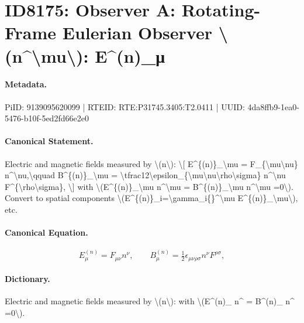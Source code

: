 \section*{ID8175: Observer A: Rotating-Frame Eulerian Observer \textbackslash{}(n\textasciicircum{}\textbackslash{}mu\textbackslash{}): E\textasciicircum{}(n)\_μ}
\paragraph{Metadata.}
PiID: 9139095620099 | RTEID: RTE:P31745.3405:T2.0411 | UUID: 4da8ffb9-1ea0-5476-b10f-5ed2fd66e2e0

\paragraph{Canonical Statement.}
Electric and magnetic fields measured by \textbackslash{}(n\textbackslash{}): \textbackslash{}[ E\textasciicircum{}\{(n)\}\_\textbackslash{}mu = F\_\{\textbackslash{}mu\textbackslash{}nu\} n\textasciicircum{}\textbackslash{}nu,\textbackslash{}qquad B\textasciicircum{}\{(n)\}\_\textbackslash{}mu = \textbackslash{}tfrac12\textbackslash{}epsilon\_\{\textbackslash{}mu\textbackslash{}nu\textbackslash{}rho\textbackslash{}sigma\} n\textasciicircum{}\textbackslash{}nu F\textasciicircum{}\{\textbackslash{}rho\textbackslash{}sigma\}, \textbackslash{}] with \textbackslash{}(E\textasciicircum{}\{(n)\}\_\textbackslash{}mu n\textasciicircum{}\textbackslash{}mu = B\textasciicircum{}\{(n)\}\_\textbackslash{}mu n\textasciicircum{}\textbackslash{}mu =0\textbackslash{}). Convert to spatial components \textbackslash{}(E\textasciicircum{}\{(n)\}\_i=\textbackslash{}gamma\_i\{\}\textasciicircum{}\textbackslash{}mu E\textasciicircum{}\{(n)\}\_\textbackslash{}mu\textbackslash{}), etc.

\paragraph{Canonical Equation.}
\[
E^{(n)}_\mu = F_{\mu\nu} n^\nu,\qquad B^{(n)}_\mu = \tfrac12\epsilon_{\mu\nu\rho\sigma} n^\nu F^{\rho\sigma},
\]

\paragraph{Dictionary.}
Electric and magnetic fields measured by \textbackslash{}(n\textbackslash{}): with \textbackslash{}(E\textasciicircum{}(n)\_ n\textasciicircum{} = B\textasciicircum{}(n)\_ n\textasciicircum{} =0\textbackslash{}).

